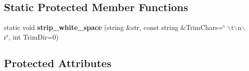 \subsection*{\-Static \-Protected \-Member \-Functions}
\begin{DoxyCompactItemize}
\item 
\hypertarget{classINIReader_ad323be0c86dc65972d6193e5e086c018}{static void {\bfseries strip\-\_\-white\-\_\-space} (string \&str, const string \&\-Trim\-Chars=\char`\"{} $\backslash$t$\backslash$n$\backslash$r\char`\"{}, int \-Trim\-Dir=0)}\label{d5/de4/classINIReader_ad323be0c86dc65972d6193e5e086c018}

\end{DoxyCompactItemize}
\subsection*{\-Protected \-Attributes}
